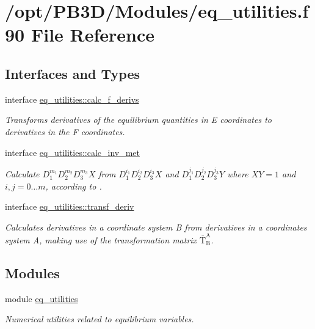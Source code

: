 \hypertarget{eq__utilities_8f90}{}\section{/opt/\+P\+B3\+D/\+Modules/eq\+\_\+utilities.f90 File Reference}
\label{eq__utilities_8f90}
\subsection*{Interfaces and Types}
\begin{DoxyCompactItemize}
\item 
interface \hyperlink{interfaceeq__utilities_1_1calc__f__derivs}{eq\+\_\+utilities\+::calc\+\_\+f\+\_\+derivs}
\begin{DoxyCompactList}\small\item\em Transforms derivatives of the equilibrium quantities in E coordinates to derivatives in the F coordinates. \end{DoxyCompactList}\item 
interface \hyperlink{interfaceeq__utilities_1_1calc__inv__met}{eq\+\_\+utilities\+::calc\+\_\+inv\+\_\+met}
\begin{DoxyCompactList}\small\item\em Calculate $D_1^{m_1} D_2^{m_2} D_3^{m_3} X$ from $D_1^{i_1} D_2^{i_2} D_3^{i_3} X$ and $D_1^{j_1} D_2^{j_2} D_3^{j_3} Y$ where $XY=1$ and $i,j = 0\ldots m$, according to \cite{Weyens3D}. \end{DoxyCompactList}\item 
interface \hyperlink{interfaceeq__utilities_1_1transf__deriv}{eq\+\_\+utilities\+::transf\+\_\+deriv}
\begin{DoxyCompactList}\small\item\em Calculates derivatives in a coordinate system B from derivatives in a coordinates system A, making use of the transformation matrix $\overline{\text{T}}_\text{B}^\text{A}$. \end{DoxyCompactList}\end{DoxyCompactItemize}
\subsection*{Modules}
\begin{DoxyCompactItemize}
\item 
module \hyperlink{namespaceeq__utilities}{eq\+\_\+utilities}
\begin{DoxyCompactList}\small\item\em Numerical utilities related to equilibrium variables. \end{DoxyCompactList}\end{DoxyCompactItemize}
